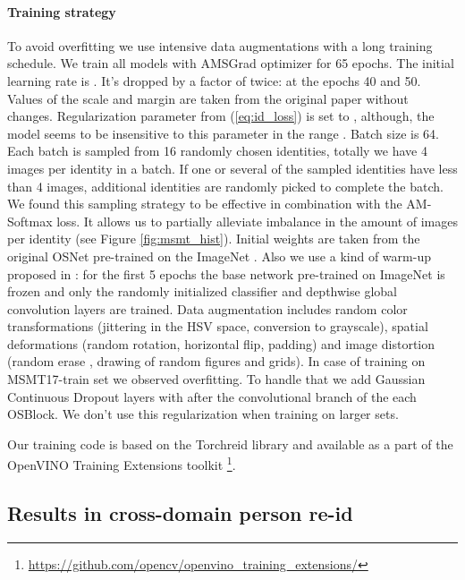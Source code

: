 \documentclass[a4paper,conference]{IEEEtran}
\begin{document}
\paragraph{Training strategy}

To avoid overfitting we use intensive data augmentations with a long training
schedule.  We train all models with AMSGrad optimizer \cite{amsgrad} for 65
epochs. The initial learning rate is .  It's dropped by a factor of 
twice: at the epochs 40 and 50.  Values of the scale  and margin  are taken
from the original paper \cite{amSoftmax} without changes. Regularization
parameter  from (\ref{eq:id_loss}) is set to , although, the model
seems to be insensitive to this parameter in the range .
Batch size is 64. Each batch is sampled from 16 randomly chosen identities, totally
we have 4 images per identity in a batch. If one or several of the sampled identities
have less than 4 images, additional identities are randomly picked to
complete the batch. We found this sampling strategy to be effective in combination with the AM-Softmax
loss. It allows us to partially alleviate imbalance in the amount of images per
identity (see Figure \ref{fig:msmt_hist}).  Initial weights are taken from the
original OSNet pre-trained on the ImageNet \cite{imagenet_cvpr09}.  Also we use
a kind of warm-up proposed in \cite{zhou2019osnet}: for the first 5 epochs the
base network pre-trained on ImageNet is frozen and only the randomly initialized
classifier and depthwise global convolution layers are trained.  Data augmentation
includes random color transformations (jittering in the HSV space, conversion to
grayscale), spatial deformations (random rotation, horizontal flip, padding) and
image distortion (random erase \cite{zhong2020random}, drawing of random figures
and grids). In case of training on MSMT17-train set we observed overfitting.
To handle that we add  Gaussian Continuous Dropout layers \cite{continuosDropout} with
 after the convolutional branch of the each OSBlock.
We don't use this regularization when training on larger sets.

Our training code is based on the Torchreid library
\cite{torchreid} and available as a part of the
OpenVINO\textsuperscript{\textregistered} Training Extensions toolkit
\footnote{\url{https://github.com/opencv/openvino_training_extensions/}}.

\subsection{Results in cross-domain person re-id}
\end{document}
